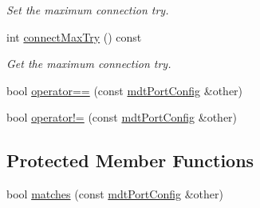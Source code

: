 \begin{DoxyCompactItemize}
\begin{DoxyCompactList}\small\item\em Set the maximum connection try. \end{DoxyCompactList}\item 
int \hyperlink{classmdt_port_config_a98aa42afacba9bfe28d3f02a6b849f60}{connect\-Max\-Try} () const 
\begin{DoxyCompactList}\small\item\em Get the maximum connection try. \end{DoxyCompactList}\item 
bool \hyperlink{classmdt_port_config_a639c71f90cfeb7e2160ad90e9775054b}{operator==} (const \hyperlink{classmdt_port_config}{mdt\-Port\-Config} \&other)
\item 
bool \hyperlink{classmdt_port_config_a5a539c86934d41306a3ed18a8292457d}{operator!=} (const \hyperlink{classmdt_port_config}{mdt\-Port\-Config} \&other)
\end{DoxyCompactItemize}
\subsection*{Protected Member Functions}
\begin{DoxyCompactItemize}
\item 
bool \hyperlink{classmdt_port_config_a6372ebc36d4476899e2274299ae5799d}{matches} (const \hyperlink{classmdt_port_config}{mdt\-Port\-Config} \&other)
\end{DoxyCompactItemize}
